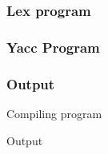\subsubsection{Lex program}

\subsubsection{Yacc Program}

\subsubsection{Output}
Compiling program



\vspace{0.5cm}
Output
